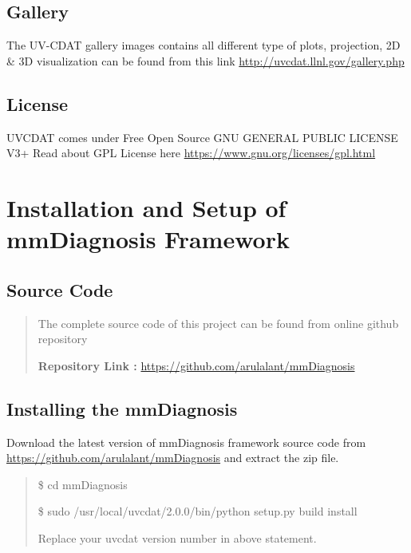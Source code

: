 \documentclass[letterpaper,10pt,english]{sphinxmanual}
\begin{document}
\section{Gallery}
\label{getting_started:gallery}
The UV-CDAT gallery images contains all different type of plots, projection, 2D \&
3D visualization can be found from this link  \href{http://uvcdat.llnl.gov/gallery.php}{http://uvcdat.llnl.gov/gallery.php}


\section{License}
\label{getting_started:license}
UVCDAT comes under Free Open Source GNU GENERAL PUBLIC LICENSE V3+
Read about GPL License here \href{https://www.gnu.org/licenses/gpl.html}{https://www.gnu.org/licenses/gpl.html}


\chapter{Installation and Setup of mmDiagnosis Framework}
\label{diag_install:installation-and-setup-of-mmdiagnosis-framework}\label{diag_install::doc}\label{diag_install:mmdiagnosis-installation}

\section{Source Code}
\label{diag_install:source-code}\begin{quote}

The complete source code of this project can be found from online github repository

\textbf{Repository Link :} \href{https://github.com/arulalant/mmDiagnosis}{https://github.com/arulalant/mmDiagnosis}
\end{quote}


\section{Installing the mmDiagnosis}
\label{diag_install:installing-the-mmdiagnosis}
Download the latest version of mmDiagnosis framework source code from \href{https://github.com/arulalant/mmDiagnosis}{https://github.com/arulalant/mmDiagnosis}
and extract the zip file.
\begin{quote}

\$ cd mmDiagnosis

\$ sudo /usr/local/uvcdat/2.0.0/bin/python setup.py build install

Replace your uvcdat version number in above statement.
\end{quote}
\end{document}
